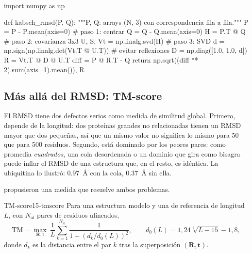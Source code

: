 \begin{codigo}[kabsch.py]
import numpy as np

def kabsch_rmsd(P, Q):
    """P, Q: arrays (N, 3) con correspondencia fila a fila."""
    P = P - P.mean(axis=0)                 # paso 1: centrar
    Q = Q - Q.mean(axis=0)
    H = P.T @ Q                            # paso 2: covarianza 3x3
    U, S, Vt = np.linalg.svd(H)            # paso 3: SVD
    d = np.sign(np.linalg.det(Vt.T @ U.T))  # evitar reflexiones
    D = np.diag([1.0, 1.0, d])
    R = Vt.T @ D @ U.T
    diff = P @ R.T - Q
    return np.sqrt((diff ** 2).sum(axis=1).mean()), R
\end{codigo}

\subsection{Más allá del RMSD: TM-score}

El RMSD tiene dos defectos serios como medida de similitud global. Primero, depende de la longitud: dos proteínas grandes no relacionadas tienen un RMSD mayor que dos pequeñas, así que un mismo valor no significa lo mismo para 50 que para 500 residuos. Segundo, está dominado por los peores pares: como promedia \emph{cuadrados}, una cola desordenada o un dominio que gira como bisagra puede inflar el RMSD de una estructura que, en el resto, es idéntica. La ubiquitina lo ilustró: \SI{0,97}{\angstrom} con la cola, \SI{0,37}{\angstrom} sin ella.

\textcite{c15-zhang2004} propusieron una medida que resuelve ambos problemas.

\begin{definicion}{TM-score}{15-tmscore}
Para una estructura modelo y una de referencia de longitud $L$, con $N_{\mathrm{al}}$ pares de residuos alineados,
\begin{equation}\label{eq:15-tmscore}
\mathrm{TM} = \max_{\mathbf R,\mathbf t}\ \frac1L\sum_{k=1}^{N_{\mathrm{al}}}\frac{1}{1+\left(d_k/d_0(L)\right)^2},
\qquad d_0(L)=1{,}24\sqrt[3]{L-15}-1{,}8,
\end{equation}
donde $d_k$ es la distancia entre el par $k$ tras la superposición $(\mathbf R,\mathbf t)$.
\end{definicion}

\begin{simbolos}
\end{simbolos}

